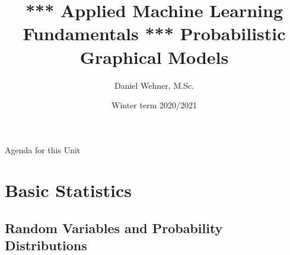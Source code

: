 


\title[Probabilistic Graphical Models]{*** Applied Machine Learning Fundamentals *** Probabilistic Graphical Models}
\author{Daniel Wehner, M.Sc.}
\date{Winter term 2020/2021}




\maketitlepage




\begin{frame}{Agenda for this Unit}
	\begin{multicols}{2}
		\tableofcontents
	\end{multicols}
\end{frame}


\section{Basic Statistics}

\subsection{Random Variables and Probability Distributions}

